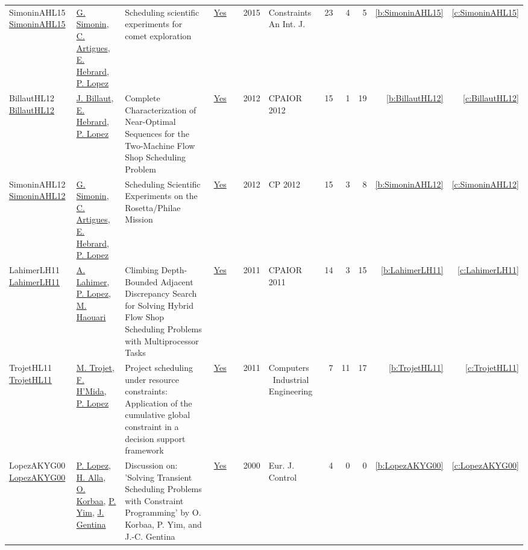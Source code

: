 {\begin{longtable}{>{\raggedright\arraybackslash}p{3cm}>{\raggedright\arraybackslash}p{6cm}>{\raggedright\arraybackslash}p{6.5cm}rrrp{2.5cm}rrrrr}
SimoninAHL15 \href{https://doi.org/10.1007/s10601-014-9169-3}{SimoninAHL15} & \hyperref[auth:a127]{G. Simonin}, \hyperref[auth:a6]{C. Artigues}, \hyperref[auth:a1]{E. Hebrard}, \hyperref[auth:a3]{P. Lopez} & Scheduling scientific experiments for comet exploration & \href{works/SimoninAHL15.pdf}{Yes} & \cite{SimoninAHL15} & 2015 & Constraints An Int. J. & 23 & 4 & 5 & \ref{b:SimoninAHL15} & \ref{c:SimoninAHL15}\\
BillautHL12 \href{https://doi.org/10.1007/978-3-642-29828-8\_5}{BillautHL12} & \hyperref[auth:a343]{J. Billaut}, \hyperref[auth:a1]{E. Hebrard}, \hyperref[auth:a3]{P. Lopez} & Complete Characterization of Near-Optimal Sequences for the Two-Machine Flow Shop Scheduling Problem & \href{works/BillautHL12.pdf}{Yes} & \cite{BillautHL12} & 2012 & CPAIOR 2012 & 15 & 1 & 19 & \ref{b:BillautHL12} & \ref{c:BillautHL12}\\
SimoninAHL12 \href{https://doi.org/10.1007/978-3-642-33558-7\_5}{SimoninAHL12} & \hyperref[auth:a127]{G. Simonin}, \hyperref[auth:a6]{C. Artigues}, \hyperref[auth:a1]{E. Hebrard}, \hyperref[auth:a3]{P. Lopez} & Scheduling Scientific Experiments on the Rosetta/Philae Mission & \href{works/SimoninAHL12.pdf}{Yes} & \cite{SimoninAHL12} & 2012 & CP 2012 & 15 & 3 & 8 & \ref{b:SimoninAHL12} & \ref{c:SimoninAHL12}\\
LahimerLH11 \href{https://doi.org/10.1007/978-3-642-21311-3\_12}{LahimerLH11} & \hyperref[auth:a355]{A. Lahimer}, \hyperref[auth:a3]{P. Lopez}, \hyperref[auth:a356]{M. Haouari} & Climbing Depth-Bounded Adjacent Discrepancy Search for Solving Hybrid Flow Shop Scheduling Problems with Multiprocessor Tasks & \href{works/LahimerLH11.pdf}{Yes} & \cite{LahimerLH11} & 2011 & CPAIOR 2011 & 14 & 3 & 15 & \ref{b:LahimerLH11} & \ref{c:LahimerLH11}\\
TrojetHL11 \href{https://doi.org/10.1016/j.cie.2010.08.014}{TrojetHL11} & \hyperref[auth:a715]{M. Trojet}, \hyperref[auth:a716]{F. H'Mida}, \hyperref[auth:a3]{P. Lopez} & Project scheduling under resource constraints: Application of the cumulative global constraint in a decision support framework & \href{works/TrojetHL11.pdf}{Yes} & \cite{TrojetHL11} & 2011 & Computers \  Industrial Engineering & 7 & 11 & 17 & \ref{b:TrojetHL11} & \ref{c:TrojetHL11}\\
LopezAKYG00 \href{https://doi.org/10.1016/S0947-3580(00)71114-9}{LopezAKYG00} & \hyperref[auth:a3]{P. Lopez}, \hyperref[auth:a693]{H. Alla}, \hyperref[auth:a690]{O. Korbaa}, \hyperref[auth:a691]{P. Yim}, \hyperref[auth:a692]{J. Gentina} & Discussion on: 'Solving Transient Scheduling Problems with Constraint Programming' by O. Korbaa, P. Yim, and {J.-C.} Gentina & \href{works/LopezAKYG00.pdf}{Yes} & \cite{LopezAKYG00} & 2000 & Eur. J. Control & 4 & 0 & 0 & \ref{b:LopezAKYG00} & \ref{c:LopezAKYG00}\\

\end{longtable}}
